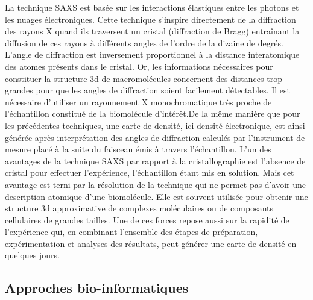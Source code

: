 La technique SAXS est basée sur les interactions élastiques entre les photons et les nuages électroniques. Cette technique s'inspire directement de la diffraction des rayons X quand ils traversent un cristal (diffraction de Bragg) entraînant la diffusion de ces rayons à différents angles de l'ordre de la dizaine de degrés. L'angle de diffraction est inversement proportionnel à la distance interatomique des atomes présents dans le cristal. Or, les informations nécessaires pour constituer la structure 3d de macromolécules concernent des distances trop grandes pour que les angles de diffraction soient facilement détectables. Il est nécessaire d'utiliser un rayonnement X monochromatique très proche de l'échantillon constitué de la biomolécule d'intérêt.De la même manière que pour les précédentes techniques, une carte de densité, ici densité électronique, est ainsi générée après interprétation des angles de diffraction calculés par l'instrument de mesure placé à la suite du faisceau émis à travers l'échantillon.
L'un des avantages de la technique SAXS par rapport à la cristallographie est l'absence de cristal pour effectuer l'expérience, l'échantillon étant mis en solution. Mais cet avantage est terni par la résolution de la technique qui ne permet pas d'avoir une description atomique d'une biomolécule. Elle est souvent utilisée pour obtenir une structure 3d approximative de complexes moléculaires ou de composants cellulaires de grandes tailles. Une de ces forces repose aussi sur la rapidité de l'expérience qui, en combinant l'ensemble des étapes de préparation, expérimentation et analyses des résultats, peut générer une carte de densité en quelques jours.

\subsection{Approches bio-informatiques}


